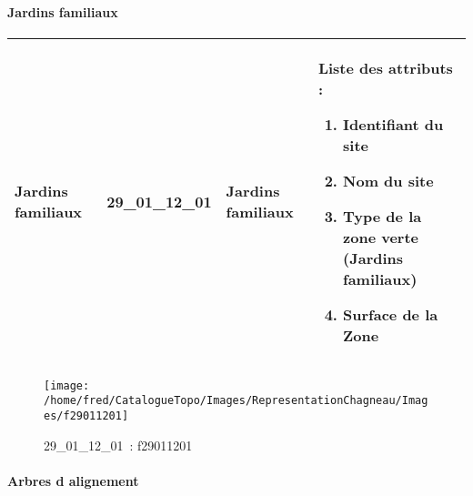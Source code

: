 \documentclass[12pt,titlepage]{book}
\begin{document}
\paragraph{Jardins familiaux}
\noindent
\vspace{\baselineskip}

\renewcommand{\arraystretch}{1.2}
\begin{supertabular}{|p{10cm}|c|p{13cm}|p{12cm}|}
 Jardins familiaux & 29\_01\_12\_01 & Jardins familiaux & Liste des attributs :
\begin{enumerate}
  \item Identifiant du site  \item Nom du site  \item Type de la zone verte (Jardins familiaux)  \item Surface de la Zone\end{enumerate}
\\
\hline
\end{supertabular}
\begin{figure}[h!]
  \hfill         %
  \begin{minipage}[t]{3cm}
    \begin{center}
      \texttt{[image: /home/fred/CatalogueTopo/Images/RepresentationChagneau/Images/f29011201]}
      \caption[~29\_01\_12\_01]{\small{29\_01\_12\_01~:} \tiny{f29011201}}\label{f29011201}
    \end{center}
  \end{minipage}
\end{figure}


\paragraph{Arbres d alignement}
\noindent
\vspace{\baselineskip}
\end{document}
